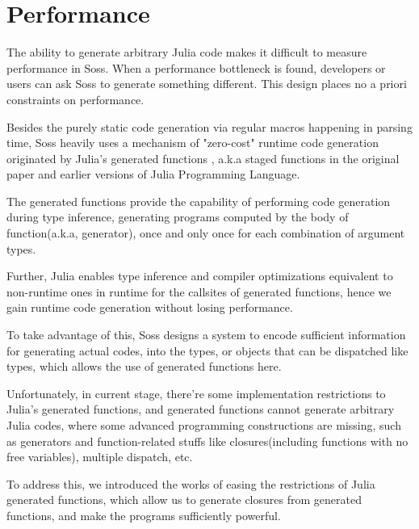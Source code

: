 \documentclass[anonymous=false, %
               format=acmsmall, %
               review=true, %
               screen=true, %
               nonacm=true]{acmart}
\begin{document}
\section{Performance}



The ability to generate arbitrary  Julia code makes it difficult to measure performance in Soss. When a performance bottleneck is found, developers or users can ask Soss to generate something different. This design places no a priori constraints on performance.


Besides the purely static code generation via regular macros happening in parsing time, Soss heavily uses a mechanism of "zero-cost" runtime code generation originated by Julia's generated functions \cite{bezanson2012julia}, a.k.a staged functions in the original paper and earlier versions of Julia Programming Language.

The generated functions provide the capability of performing code generation during type inference, generating programs computed by the body of function(a.k.a, generator), once and only once for each combination of argument types.

Further, Julia enables type inference and compiler optimizations equivalent to non-runtime ones in runtime for the callsites of generated functions, hence we gain runtime code generation without losing performance.

To take advantage of this, Soss designs a system to encode sufficient information for generating actual codes, into the types, or objects that can be dispatched like types, which allows the use of generated functions here.

Unfortunately, in current stage, there're some implementation restrictions to Julia's generated functions, and generated functions cannot generate arbitrary Julia codes,
where some advanced programming constructions are missing, such as generators and function-related stuffs like closures(including functions with no free variables), multiple dispatch, etc.

To address this, we introduced the works of easing the restrictions of Julia generated functions,
which allow us to generate closures from generated functions, and make the programs sufficiently powerful.
\end{document}
